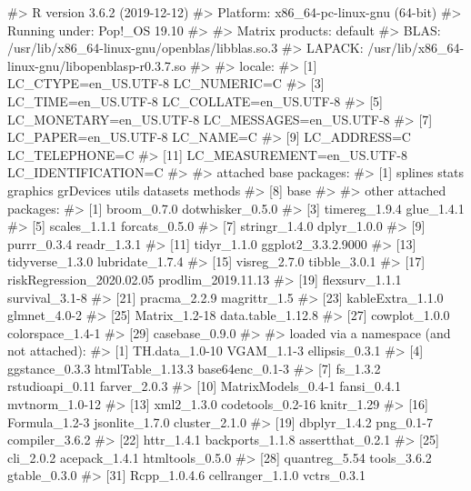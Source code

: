 \documentclass[
]{jss}
\begin{document}
\begin{CodeChunk}

\begin{CodeOutput}
#> R version 3.6.2 (2019-12-12)
#> Platform: x86_64-pc-linux-gnu (64-bit)
#> Running under: Pop!_OS 19.10
#> 
#> Matrix products: default
#> BLAS:   /usr/lib/x86_64-linux-gnu/openblas/libblas.so.3
#> LAPACK: /usr/lib/x86_64-linux-gnu/libopenblasp-r0.3.7.so
#> 
#> locale:
#>  [1] LC_CTYPE=en_US.UTF-8       LC_NUMERIC=C              
#>  [3] LC_TIME=en_US.UTF-8        LC_COLLATE=en_US.UTF-8    
#>  [5] LC_MONETARY=en_US.UTF-8    LC_MESSAGES=en_US.UTF-8   
#>  [7] LC_PAPER=en_US.UTF-8       LC_NAME=C                 
#>  [9] LC_ADDRESS=C               LC_TELEPHONE=C            
#> [11] LC_MEASUREMENT=en_US.UTF-8 LC_IDENTIFICATION=C       
#> 
#> attached base packages:
#> [1] splines   stats     graphics  grDevices utils     datasets  methods  
#> [8] base     
#> 
#> other attached packages:
#>  [1] broom_0.7.0               dotwhisker_0.5.0         
#>  [3] timereg_1.9.4             glue_1.4.1               
#>  [5] scales_1.1.1              forcats_0.5.0            
#>  [7] stringr_1.4.0             dplyr_1.0.0              
#>  [9] purrr_0.3.4               readr_1.3.1              
#> [11] tidyr_1.1.0               ggplot2_3.3.2.9000       
#> [13] tidyverse_1.3.0           lubridate_1.7.4          
#> [15] visreg_2.7.0              tibble_3.0.1             
#> [17] riskRegression_2020.02.05 prodlim_2019.11.13       
#> [19] flexsurv_1.1.1            survival_3.1-8           
#> [21] pracma_2.2.9              magrittr_1.5             
#> [23] kableExtra_1.1.0          glmnet_4.0-2             
#> [25] Matrix_1.2-18             data.table_1.12.8        
#> [27] cowplot_1.0.0             colorspace_1.4-1         
#> [29] casebase_0.9.0           
#> 
#> loaded via a namespace (and not attached):
#>  [1] TH.data_1.0-10      VGAM_1.1-3          ellipsis_0.3.1     
#>  [4] ggstance_0.3.3      htmlTable_1.13.3    base64enc_0.1-3    
#>  [7] fs_1.3.2            rstudioapi_0.11     farver_2.0.3       
#> [10] MatrixModels_0.4-1  fansi_0.4.1         mvtnorm_1.0-12     
#> [13] xml2_1.3.0          codetools_0.2-16    knitr_1.29         
#> [16] Formula_1.2-3       jsonlite_1.7.0      cluster_2.1.0      
#> [19] dbplyr_1.4.2        png_0.1-7           compiler_3.6.2     
#> [22] httr_1.4.1          backports_1.1.8     assertthat_0.2.1   
#> [25] cli_2.0.2           acepack_1.4.1       htmltools_0.5.0    
#> [28] quantreg_5.54       tools_3.6.2         gtable_0.3.0       
#> [31] Rcpp_1.0.4.6        cellranger_1.1.0    vctrs_0.3.1        

\end{CodeOutput}
\end{CodeChunk}
\end{document}

